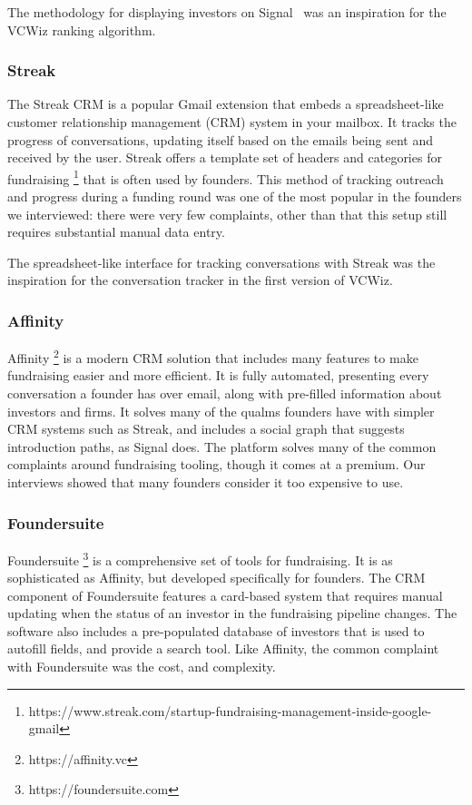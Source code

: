 The methodology for displaying investors on Signal~\cite{signal-methodolody} was an inspiration for the VCWiz ranking algorithm.

\subsubsection{Streak}

The Streak CRM is a popular Gmail extension that embeds a spreadsheet-like customer relationship management (CRM) system in your mailbox. It tracks the progress of conversations, updating itself based on the emails being sent and received by the user. Streak offers a template set of headers and categories for fundraising \footnote{https://www.streak.com/startup-fundraising-management-inside-google-gmail} that is often used by founders. This method of tracking outreach and progress during a funding round was one of the most popular in the founders we interviewed: there were very few complaints, other than that this setup still requires substantial manual data entry.

The spreadsheet-like interface for tracking conversations with Streak was the inspiration for the conversation tracker in the first version of VCWiz.

\subsubsection{Affinity}

Affinity \footnote{https://affinity.vc} is a modern CRM solution that includes many features to make fundraising easier and more efficient. It is fully automated, presenting every conversation a founder has over email, along with pre-filled information about investors and firms. It solves many of the qualms founders have with simpler CRM systems such as Streak, and includes a social graph that suggests introduction paths, as Signal does. The platform solves many of the common complaints around fundraising tooling, though it comes at a premium. Our interviews showed that many founders consider it too expensive to use.

\subsubsection{Foundersuite}

Foundersuite \footnote{https://foundersuite.com} is a comprehensive set of tools for fundraising. It is as sophisticated as Affinity, but developed specifically for founders. The CRM component of Foundersuite features a card-based system that requires manual updating when the status of an investor in the fundraising pipeline changes. The software also includes a pre-populated database of investors that is used to autofill fields, and provide a search tool. Like Affinity, the common complaint with Foundersuite was the cost, and complexity.

